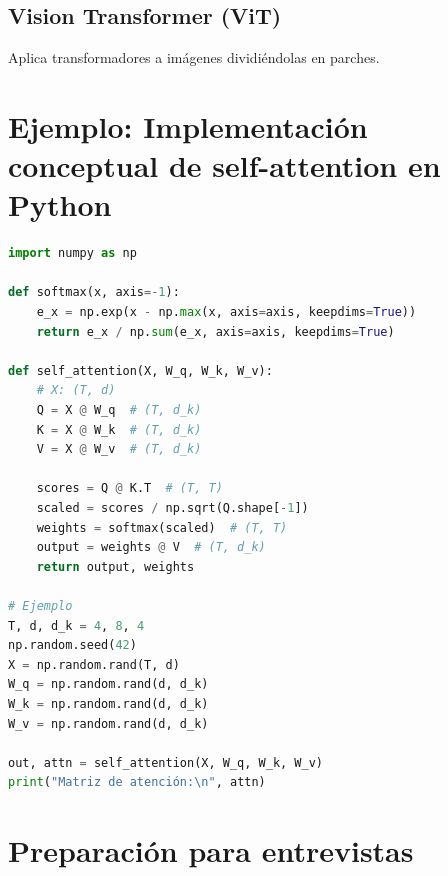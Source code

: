 \documentclass[12pt,a4paper,openany,oneside]{book}
\begin{document}
\subsection{Vision Transformer (ViT)}
Aplica transformadores a imágenes dividiéndolas en parches.

\section{Ejemplo: Implementación conceptual de self-attention en Python}

\begin{lstlisting}[language=Python]
import numpy as np

def softmax(x, axis=-1):
    e_x = np.exp(x - np.max(x, axis=axis, keepdims=True))
    return e_x / np.sum(e_x, axis=axis, keepdims=True)

def self_attention(X, W_q, W_k, W_v):
    # X: (T, d)
    Q = X @ W_q  # (T, d_k)
    K = X @ W_k  # (T, d_k)
    V = X @ W_v  # (T, d_k)
    
    scores = Q @ K.T  # (T, T)
    scaled = scores / np.sqrt(Q.shape[-1])
    weights = softmax(scaled)  # (T, T)
    output = weights @ V  # (T, d_k)
    return output, weights

# Ejemplo
T, d, d_k = 4, 8, 4
np.random.seed(42)
X = np.random.rand(T, d)
W_q = np.random.rand(d, d_k)
W_k = np.random.rand(d, d_k)
W_v = np.random.rand(d, d_k)

out, attn = self_attention(X, W_q, W_k, W_v)
print("Matriz de atención:\n", attn)
\end{lstlisting}

\section{Preparación para entrevistas}
\end{document}
